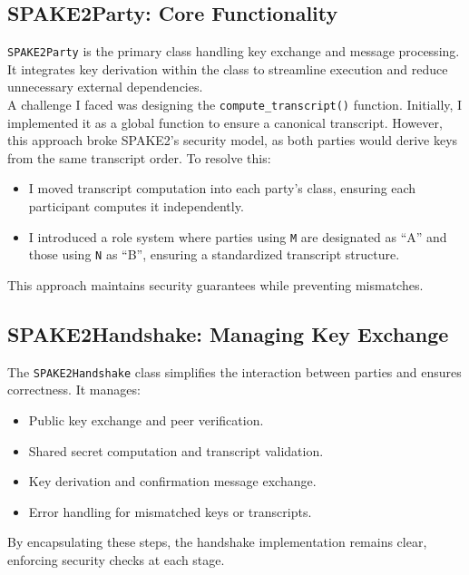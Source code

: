 \documentclass[twoside,a4paper,12pt]{article}
\begin{document}
\subsection{SPAKE2Party: Core Functionality}
\label{subsec:spake2_party}

\texttt{SPAKE2Party} is the primary class handling key exchange and message processing. It integrates key derivation within the class to streamline execution and reduce unnecessary external dependencies. \\

A challenge I faced was designing the \texttt{compute_transcript()} function. Initially, I implemented it as a global function to ensure a canonical transcript. However, this approach broke SPAKE2's security model, as both parties would derive keys from the same transcript order. To resolve this:

\begin{itemize}
\item I moved transcript computation into each party's class, ensuring each participant computes it independently.
\item I introduced a role system where parties using \texttt{M}  are designated as ``A'' and those using \texttt{N} as ``B'', ensuring a standardized transcript structure.
\end{itemize}

This approach maintains security guarantees while preventing mismatches.

\subsection{SPAKE2Handshake: Managing Key Exchange}
\label{subsec:spake2_handshake}

The \texttt{SPAKE2Handshake} class simplifies the interaction between parties and ensures correctness. It manages:

\begin{itemize}
    \item Public key exchange and peer verification.
    \item Shared secret computation and transcript validation.
    \item Key derivation and confirmation message exchange.
    \item Error handling for mismatched keys or transcripts.
\end{itemize}

By encapsulating these steps, the handshake implementation remains clear, enforcing security checks at each stage.
\end{document}
